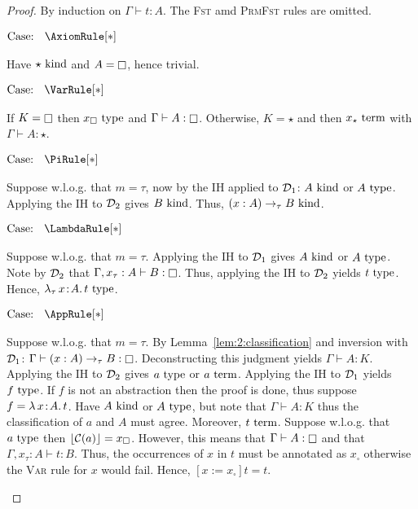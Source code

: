 \begin{proof}
    By induction on $\Gamma \vdash t : A$.
    The \textsc{Fst} amd \textsc{PrmFst} rules are omitted.

    $\text{Case: }\begin{array}{c} \AxiomRule[*] \end{array}$
    \begin{proofcase}
        Have $\star~\textnormal{kind}$ and $A = \kind$, hence trivial.
    \end{proofcase}

    $\text{Case: }\begin{array}{c} \VarRule[*] \end{array}$
    \begin{proofcase}
        If $K = \kind$ then $x_\square~\textnormal{type}$ and $\Gamma \vdash A : \kind$.
        Otherwise, $K = \star$ and then $x_\star~\textnormal{term}$ with $\Gamma \vdash A : \star$.
    \end{proofcase}

    $\text{Case: }\begin{array}{c} \PiRule[*] \end{array}$
    \begin{proofcase}
        Suppose w.l.o.g. that $m = \tau$, now by the IH applied to $\mathcal{D}_{1}$: $A~\textnormal{kind}$ or $A~\textnormal{type}$.
        Applying the IH to $\mathcal{D}_{2}$ gives $B~\textnormal{kind}$.
        Thus, $(x : A) \to_\tau B~\textnormal{kind}$.
    \end{proofcase}

    $\text{Case: }\begin{array}{c} \LambdaRule[*] \end{array}$
    \begin{proofcase}
        Suppose w.l.o.g. that $m = \tau$.
        Applying the IH to $\mathcal{D}_{1}$ gives $A~\textnormal{kind}$ or $A~\textnormal{type}$.
        Note by $\mathcal{D}_{2}$ that $\Gamma, x_\tau : A \vdash B : \kind$.
        Thus, applying the IH to $\mathcal{D}_{2}$ yields $t~\textnormal{type}$.
        Hence, ${\lambda_\tau}\, x\! : \! A.\, t~\textnormal{type}$.
    \end{proofcase}

    $\text{Case: }\begin{array}{c} \AppRule[*] \end{array}$
    \begin{proofcase}
        Suppose w.l.o.g. that $m = \tau$.
        By Lemma~\ref{lem:2:classification} and inversion with $\mathcal{D}_{1}$: $\Gamma \vdash (x : A) \to_\tau B : \kind$.
        Deconstructing this judgment yields $\Gamma \vdash A : K$.
        Applying the IH to $\mathcal{D}_{2}$ gives $a~\textnormal{type}$ or $a~\textnormal{term}$.
        Applying the IH to $\mathcal{D}_{1}$ yields $f~\textnormal{type}$.
        If $f$ is not an abstraction then the proof is done, thus suppose $f = {\lambda}\, x\! : \! A.\, t$.
        Have $A~\textnormal{kind}$ or $A~\textnormal{type}$, but note that $\Gamma \vdash A : K$ thus the classification of $a$ and $A$ must agree.
        Moreover, $t~\textnormal{term}$.
        Suppose w.l.o.g. that $a~\textnormal{type}$ then $\lfloor \mathcal{C}(a) \rfloor = x_\square$.
        However, this means that $\Gamma \vdash A : \kind$ and that $\Gamma, x_\tau : A \vdash t : B$.
        Thus, the occurrences of $x$ in $t$ must be annotated as $x_\square$ otherwise the \textsc{Var} rule for $x$ would fail.
        Hence, $[x := x_\square]t = t$.
    \end{proofcase}


\end{proof}
